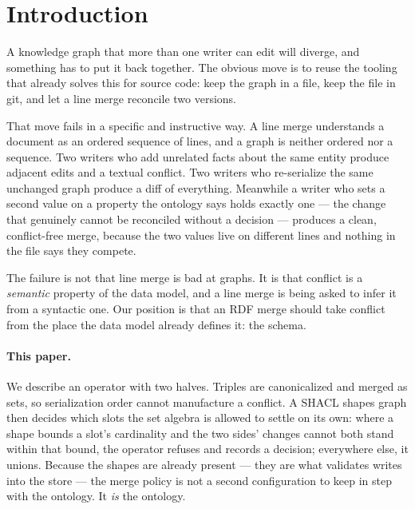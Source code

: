 \section{Introduction}

A knowledge graph that more than one writer can edit will diverge, and something
has to put it back together. The obvious move is to reuse the tooling that
already solves this for source code: keep the graph in a file, keep the file in
git, and let a line merge reconcile two versions.

That move fails in a specific and instructive way. A line merge understands a
document as an ordered sequence of lines, and a graph is neither ordered nor a
sequence. Two writers who add unrelated facts about the same entity produce
adjacent edits and a textual conflict. Two writers who re-serialize the same
unchanged graph produce a diff of everything. Meanwhile a writer who sets a
second value on a property the ontology says holds exactly one --- the change
that genuinely cannot be reconciled without a decision --- produces a clean,
conflict-free merge, because the two values live on different lines and nothing
in the file says they compete.

The failure is not that line merge is bad at graphs. It is that conflict is a
\emph{semantic} property of the data model, and a line merge is being asked to
infer it from a syntactic one. Our position is that an RDF merge should take
conflict from the place the data model already defines it: the schema.

\paragraph{This paper.} We describe an operator with two halves. Triples are
canonicalized and merged as sets, so serialization order cannot manufacture a
conflict. A SHACL shapes graph then decides which slots the set algebra is
allowed to settle on its own: where a shape bounds a slot's cardinality and
the two sides' changes cannot both stand within that bound, the operator refuses and records a
decision; everywhere else, it unions. Because the shapes are already present ---
they are what validates writes into the store --- the merge policy is not a
second configuration to keep in step with the ontology. It \emph{is} the
ontology.

